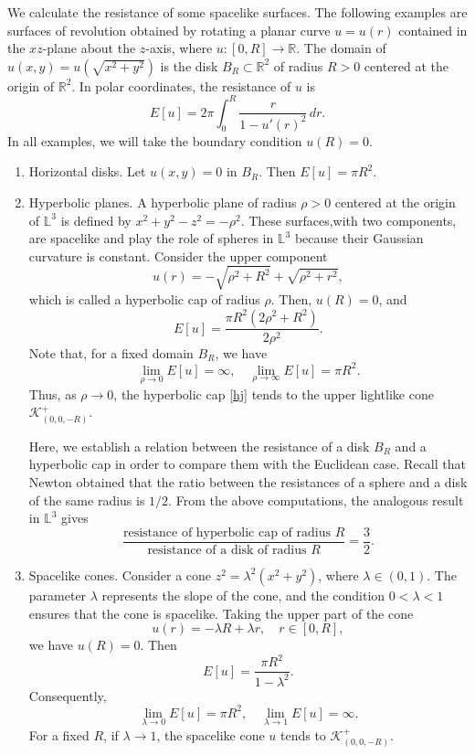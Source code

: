 \documentclass[a4paper,12pt]{amsart}
\theoremstyle{definition}
\def\r{\mathbb R}
\def\l{\mathbb L}
\begin{document}
 We calculate the resistance of some spacelike surfaces. The following examples are   surfaces of revolution obtained by rotating a planar curve $u=u(r)$ contained in the $xz$-plane  about the $z$-axis, where $u\colon [0,R]\to\r$. The domain of $u(x,y)=u(\sqrt{x^2+y^2})$ is the disk  $B_R\subset\r^2$  of radius $R>0$ centered at the origin of $\r^2$.  In polar coordinates, the resistance of $u$  is
 \begin{equation}\label{eq2}
 E[u]=2\pi\int_{0}^{R}\frac{r}{1-u'(r)^2}\, dr.
 \end{equation}
In all examples, we will take the boundary condition   $u(R)=0$. 
\begin{enumerate}
\item Horizontal disks. Let  $u(x,y)=0$ in $B_R$. Then 
 $E[u]=\pi R^2$. 

 
\item  Hyperbolic planes. A hyperbolic plane of radius $\rho>0$ centered at the origin of $\l^3$ is defined by  $x^2+y^2-z^2=-\rho^2$. These surfaces,with two components,  are spacelike and play the role of spheres in $\l^3$ because their Gaussian curvature  is constant.  Consider   the upper component    
\begin{equation}\label{hj}
 u(r)=-\sqrt{\rho^2+R^2}+\sqrt{\rho^2+r^2},
\end{equation}
which is called a hyperbolic cap of radius $\rho$.  Then, $u(R)=0$, and  
$$E[u] = \frac{\pi  R^2 \left(2 \rho^2+R^2\right)}{2 \rho^2}.$$
Note that, for a fixed domain $B_R$, we have
$$\lim_{\rho\to 0}E[u]=\infty,\quad \lim_{\rho\to \infty}E[u]= \pi R^2.$$
Thus, as $\rho\to 0$, the hyperbolic cap  \eqref{hj} tends to   the upper lightlike cone $\mathcal{K}^+_{(0,0,-R)}$. 

Here, we establish a   relation between the resistance of a disk $B_R$ and a hyperbolic cap in order to compare them with the Euclidean case. Recall that Newton obtained that the ratio between the resistances of a sphere and a disk of the same radius is $1/2$. From the above computations,   the analogous result in $\l^3$ gives 
$$\frac{\mbox{resistance of hyperbolic cap of radius $R$}}{\mbox{resistance of a disk of radius $R$}}=\frac{3}{2}.$$
  

\item Spacelike cones.  Consider a cone $z^2=\lambda^2(x^2+y^2)$, where $\lambda\in (0,1)$. The parameter $\lambda$ represents the slope of the cone,  and the condition $0<\lambda<1$ ensures  that the cone is   spacelike. Taking  the upper part of the cone 
\begin{equation}\label{cj}
 u(r)=-\lambda R+\lambda r,\quad r\in [0,R],
\end{equation}
we  have $u(R)=0$. Then 
$$E[u]= \frac{\pi R^2}{1-\lambda^2}.$$
Consequently,
$$\lim_{\lambda\to 0}E[u]=\pi R^2,\quad \lim_{\lambda\to 1}E[u]= \infty.$$
For  a fixed $R$,  if $\lambda \to 1$, the spacelike cone $u$ tends to $\mathcal{K}^+_{(0,0,-R)}$.
 
 \end{enumerate}
 
\end{document}
